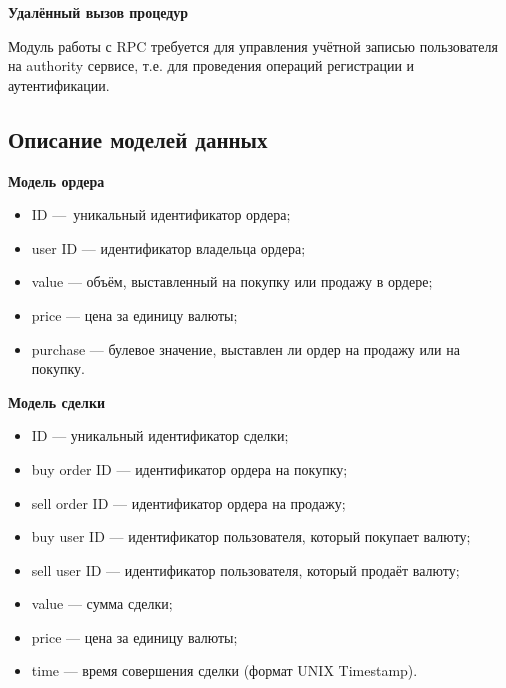 \textbf{Удалённый вызов процедур}

Модуль работы с RPC требуется для управления учётной записью пользователя на authority сервисе, т.е. для проведения операций регистрации и аутентификации.

\subsection{Описание моделей данных}\label{sec:domain:models}

\textbf{Модель ордера}

\begin{itemize}
    \item ID — уникальный идентификатор ордера;
    \item user ID — идентификатор владельца ордера;
    \item value — объём, выставленный на покупку или продажу в ордере;
    \item price — цена за единицу валюты;
    \item purchase — булевое значение, выставлен ли ордер на продажу или на покупку.
\end{itemize}

\textbf{Модель сделки}

\begin{itemize}
    \item ID — уникальный идентификатор сделки;
    \item buy order ID — идентификатор ордера на покупку;
    \item sell order ID — идентификатор ордера на продажу;
    \item buy user ID — идентификатор пользователя, который покупает валюту;
    \item sell user ID — идентификатор пользователя, который продаёт валюту;
    \item value — сумма сделки;
    \item price — цена за единицу валюты;
    \item time — время совершения сделки (формат UNIX Timestamp).
\end{itemize}

